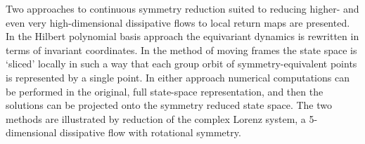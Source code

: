 Two approaches to continuous symmetry reduction suited to
reducing higher- and even very
high-dimensional dissipative flows to local return maps are
presented. In the Hilbert polynomial basis approach the
equivariant dynamics is rewritten in terms of invariant
coordinates. In the method of moving frames the state space
is `sliced' locally in such a way that each group orbit of
symmetry-equivalent points is represented by a single point.
In either approach numerical computations can be performed in
the original, full state-space representation, and then the
solutions can be projected onto the symmetry reduced state
space. The two methods are illustrated by
reduction of the complex Lorenz system, a 5-dimensional
dissipative flow with rotational symmetry.
